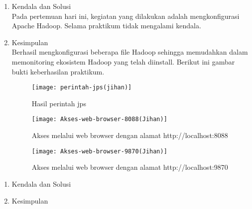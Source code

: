 \begin{enumerate}
\item Kendala dan Solusi \\
Pada pertemuan hari ini, kegiatan yang dilakukan adalah mengkonfigurasi Apache Hadoop. Selama praktikum tidak mengalami kendala.

\item Kesimpulan \\
Berhasil mengkonfigurasi beberapa file Hadoop sehingga memudahkan dalam memonitoring ekosistem Hadoop yang telah diinstall. Berikut ini gambar bukti keberhasilan praktikum. 

\begin{figure}[!ht]
\texttt{[image: perintah-jps(jihan)]}
\caption{Hasil perintah jps}
\label{gam:perintah-jps(jihan)}
\end{figure} 

\begin{figure}[!ht]
\texttt{[image: Akses-web-browser-8088(Jihan)]}
\caption{Akses melalui web browser dengan alamat http://localhost:8088}
\label{gam:Akses-web-browser-8088(Jihan)}
\end{figure} 

\begin{figure}[!ht]
\texttt{[image: Akses-web-browser-9870(Jihan)]}
\caption{Akses melalui web browser dengan alamat http://localhost:9870}
\label{gam:Akses-web-browser-9870(Jihan)}
\end{figure} 


\end{enumerate}


\begin{enumerate}
\item Kendala dan Solusi \\



\item Kesimpulan \\


\end{enumerate}





